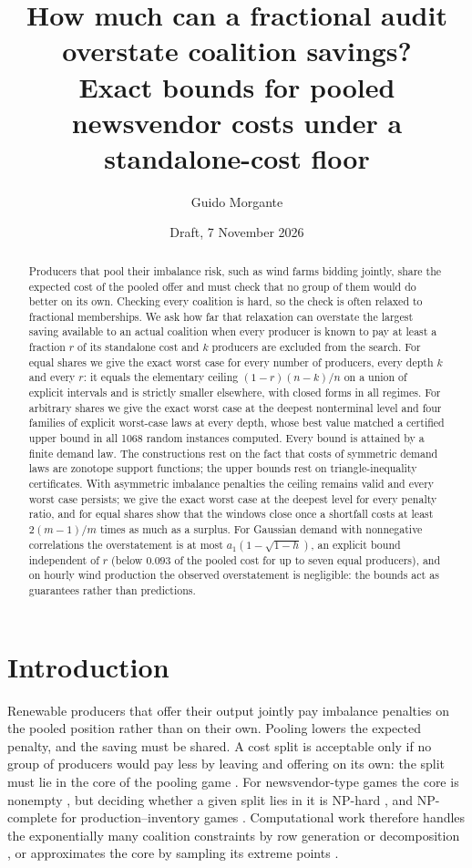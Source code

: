 \documentclass[11pt,a4paper]{article}
\title{How much can a fractional audit overstate coalition savings?\\
Exact bounds for pooled newsvendor costs under a standalone-cost floor}
\author{Guido Morgante}
\date{Draft, 7 November 2026}
\theoremstyle{remark}
\begin{document}
\maketitle

\begin{abstract}
Producers that pool their imbalance risk, such as wind farms bidding jointly,
share the expected cost of the pooled offer and must check that no group of
them would do better on its own. Checking every coalition is hard, so the check
is often relaxed to fractional memberships. We ask how far that relaxation can
overstate the largest saving available to an actual coalition when every
producer is known to pay at least a fraction $r$ of its standalone cost and $k$
producers are excluded from the search. For equal shares we give the exact
worst case for every number of producers, every depth $k$ and every $r$: it
equals the elementary ceiling $(1-r)(n-k)/n$ on a union of explicit intervals
and is strictly smaller elsewhere, with closed forms in all regimes. For
arbitrary shares we give the exact worst case at the deepest nonterminal level
and four families of explicit worst-case laws at every depth, whose best value
matched a certified upper bound in all 1068 random instances computed. Every
bound is attained by a finite demand law. The constructions rest on the fact
that costs of symmetric demand laws are zonotope support functions; the upper
bounds rest on triangle-inequality certificates. With asymmetric imbalance
penalties the ceiling remains valid and every worst case persists; we give the
exact worst case at the deepest level for every penalty ratio, and for equal
shares show that the windows close once a shortfall costs at least $2(m-1)/m$
times as much as a surplus. For Gaussian demand with nonnegative
correlations the overstatement is at most $a_1(1-\sqrt{1-h})$, an explicit
bound independent of $r$ (below $0.093$ of the pooled cost for up to seven
equal producers), and on hourly wind production the observed overstatement is
negligible: the bounds act as guarantees rather than predictions.
\end{abstract}

\section{Introduction}

Renewable producers that offer their output jointly pay imbalance penalties on
the pooled position rather than on their own. Pooling lowers the expected
penalty, and the saving must be shared. A cost split is acceptable only if no
group of producers would pay less by leaving and offering on its own: the split
must lie in the core of the pooling game \citep{baeyens2013wind,
chakraborty2018causation}. For newsvendor-type games the core is nonempty
\citep{hartman2000cores, muller2002newsvendor, montrucchio2012review}, but
deciding whether a given split lies in it is NP-hard
\citep{chenzhang2009inventorygames}, and NP-complete for production--inventory
games \citep{guardiola2020quid}. Computational work therefore handles the
exponentially many coalition constraints by row generation or decomposition
\citep{bonnans2008leastcore, freire2015nucleolus}, or approximates the core by
sampling its extreme points \citep{camacho2025core}.
\end{document}
